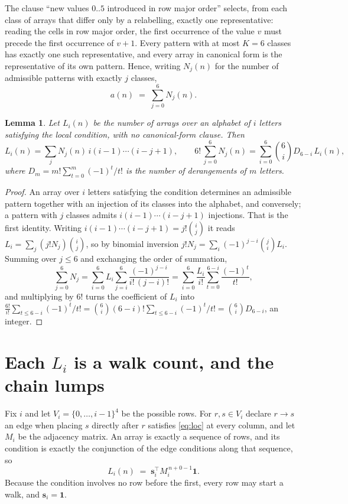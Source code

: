 \documentclass[11pt,a4paper]{article}
\theoremstyle{plain}
\newtheorem{lemma}[theorem]{Lemma}
\theoremstyle{definition}
\begin{document}
The clause ``new values $0..5$ introduced in row major order'' selects, from each class
of arrays that differ only by a relabelling, exactly one representative: reading the cells in
row major order, the first occurrence of the value $v$ must precede the first occurrence of
$v+1$. Every pattern with at most $K=6$ classes has exactly one such representative, and
every array in canonical form is the representative of its own pattern. Hence, writing
$N_j(n)$ for the number of admissible patterns with exactly $j$ classes,
\begin{equation}\label{eq:apat}
a(n)\;=\;\sum_{j=0}^{6}N_j(n).
\end{equation}

\begin{lemma}\label{lem:inv}
Let $L_i(n)$ be the number of arrays over an alphabet of $i$ letters satisfying the local
condition, with no canonical-form clause. Then
\[
L_i(n)=\sum_j N_j(n)\,i(i-1)\cdots(i-j+1),
\qquad
6!\,\sum_{j=0}^{6}N_j(n)=\sum_{i=0}^{6}\binom{6}{i}D_{6-i}\,L_i(n),
\]
where $D_m=m!\sum_{t=0}^{m}(-1)^t/t!$ is the number of derangements of $m$ letters.
\end{lemma}

\begin{proof}
An array over $i$ letters satisfying the condition determines an admissible pattern together
with an injection of its classes into the alphabet, and conversely; a pattern with $j$
classes admits $i(i-1)\cdots(i-j+1)$ injections. That is the first identity. Writing
$i(i-1)\cdots(i-j+1)=j!\binom{i}{j}$ it reads $L_i=\sum_j (j!N_j)\binom{i}{j}$, so by
binomial inversion $j!N_j=\sum_{i}(-1)^{j-i}\binom{j}{i}L_i$. Summing over
$j\le 6$ and exchanging the order of summation,
\[
\sum_{j=0}^{6}N_j=\sum_{i=0}^{6}L_i\sum_{j=i}^{6}\frac{(-1)^{j-i}}{i!\,(j-i)!}
=\sum_{i=0}^{6}\frac{L_i}{i!}\sum_{t=0}^{6-i}\frac{(-1)^t}{t!} ,
\]
and multiplying by $6!$ turns the coefficient of $L_i$ into
$\frac{6!}{i!}\sum_{t\le 6-i}(-1)^t/t!=\binom{6}{i}(6-i)!\sum_{t\le 6-i}(-1)^t/t!
=\binom{6}{i}D_{6-i}$, an integer.
\end{proof}

\section{Each $L_i$ is a walk count, and the chain lumps}

Fix $i$ and let $V_i=\{0,\dots,i-1\}^{4}$ be the possible rows. For $r,s\in V_i$
declare $r\to s$ an edge when placing $s$ directly after $r$ satisfies \eqref{eq:loc} at
every column, and let $M_i$ be the adjacency matrix. An array is exactly a sequence of
rows, and its condition is exactly the conjunction of the edge conditions along that
sequence, so
\[
L_i(n)\;=\;\mathbf{s}_i^{\!\top}M_i^{\,n+0-1}\mathbf{1} .
\]
Because the condition involves no row before the first, every
row may start a walk, and $\mathbf{s}_i=\mathbf{1}$.
\end{document}
